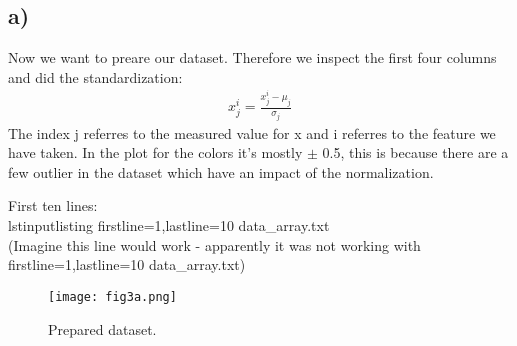\subsection{a)}
Now we want to preare our dataset. Therefore we inspect the first four columns and did the standardization:
\begin{align}
    x_j^{i} = \frac{x_j^{i} - \mu_j}{\sigma_j}
\end{align}
The index j referres to the measured value for x and i referres to the feature we have taken. In the plot for the colors it's mostly $\pm$ 0.5, this is because there are a few outlier in the dataset which have an impact of the normalization.

First ten lines:\\
lstinputlisting firstline=1,lastline=10 data_array.txt\\
(Imagine this line would work  - apparently it was not working with firstline=1,lastline=10 data_array.txt)

\begin{figure}[h!]
    \centering
    \texttt{[image: fig3a.png]}
    \caption{Prepared dataset.}
\end{figure}




